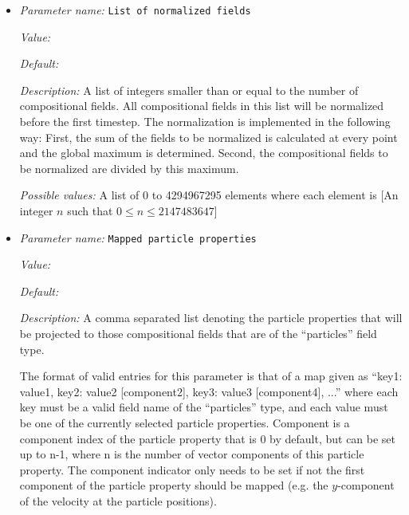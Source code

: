 \begin{itemize}
{\it Possible values:} A list of 0 to 4294967295 elements where each element is [Any one of field, particles, static, melt field, prescribed field, prescribed field with diffusion]
\item {\it Parameter name:} {\tt List of normalized fields}
\label{parameters:Compositional fields/List of normalized fields}
\label{parameters:Compositional_20fields/List_20of_20normalized_20fields}


{\it Value:} 


{\it Default:} 


{\it Description:} A list of integers smaller than or equal to the number of compositional fields. All compositional fields in this list will be normalized before the first timestep. The normalization is implemented in the following way: First, the sum of the fields to be normalized is calculated at every point and the global maximum is determined. Second, the compositional fields to be normalized are divided by this maximum.


{\it Possible values:} A list of 0 to 4294967295 elements where each element is [An integer $n$ such that $0\leq n \leq 2147483647$]
\item {\it Parameter name:} {\tt Mapped particle properties}
\label{parameters:Compositional fields/Mapped particle properties}
\label{parameters:Compositional_20fields/Mapped_20particle_20properties}


{\it Value:} 


{\it Default:} 


{\it Description:} A comma separated list denoting the particle properties that will be projected to those compositional fields that are of the ``particles'' field type.

The format of valid entries for this parameter is that of a map given as ``key1: value1, key2: value2 [component2], key3: value3 [component4], ...'' where each key must be a valid field name of the ``particles'' type, and each value must be one of the currently selected particle properties. Component is a component index of the particle property that is 0 by default, but can be set up to n-1, where n is the number of vector components of this particle property. The component indicator only needs to be set if not the first component of the particle property should be mapped (e.g. the $y$-component of the velocity at the particle positions).



\end{itemize}
